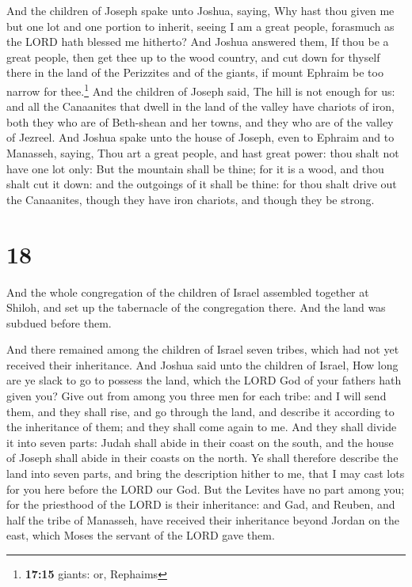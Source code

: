  And the children of Joseph spake unto Joshua, saying,
Why hast thou given me but one lot and one portion to inherit, seeing I
am a great people, forasmuch as the LORD hath blessed me hitherto?
 And Joshua answered them, If thou be a great people,
then get thee up to the wood country, and cut down for thyself there in
the land of the Perizzites and of the giants, if mount Ephraim be too
narrow for thee.\footnote{\textbf{17:15} giants: or, Rephaims}
 And the children of Joseph said, The hill is not enough
for us: and all the Canaanites that dwell in the land of the valley have
chariots of iron, both they who are of Beth-shean and her towns, and
they who are of the valley of Jezreel.  And Joshua spake
unto the house of Joseph, even to Ephraim and to Manasseh, saying, Thou
art a great people, and hast great power: thou shalt not have one lot
only:  But the mountain shall be thine; for it is a wood,
and thou shalt cut it down: and the outgoings of it shall be thine: for
thou shalt drive out the Canaanites, though they have iron chariots, and
though they be strong.

\hypertarget{section-17}{%
\section{18}\label{section-17}}

 And the whole congregation of the children of Israel
assembled together at Shiloh, and set up the tabernacle of the
congregation there. And the land was subdued before them.

 And there remained among the children of Israel seven
tribes, which had not yet received their inheritance.  And
Joshua said unto the children of Israel, How long are ye slack to go to
possess the land, which the LORD God of your fathers hath given you?
 Give out from among you three men for each tribe: and I
will send them, and they shall rise, and go through the land, and
describe it according to the inheritance of them; and they shall come
again to me.  And they shall divide it into seven parts:
Judah shall abide in their coast on the south, and the house of Joseph
shall abide in their coasts on the north.  Ye shall
therefore describe the land into seven parts, and bring the description
hither to me, that I may cast lots for you here before the LORD our God.
 But the Levites have no part among you; for the
priesthood of the LORD is their inheritance: and Gad, and Reuben, and
half the tribe of Manasseh, have received their inheritance beyond
Jordan on the east, which Moses the servant of the LORD gave them.

